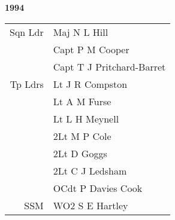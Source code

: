\begin{center}
  \Huge
  \textbf{1994}
\end{center}

\begin{center}
  \small
  \begin{tabular}{rl}
    Sqn Ldr & Maj N L Hill \\
      & Capt P M Cooper \\
      & Capt T J Pritchard-Barret \\
    Tp Ldrs & Lt J R Compston \\
      & Lt A M Furse \\
      & Lt L H Meynell \\
      & 2Lt M P Cole \\
      & 2Lt D Goggs \\
      & 2Lt C J Ledsham \\
      & OCdt P Davies Cook \\
    SSM & WO2 S E Hartley \\
  \end{tabular}
\end{center}

